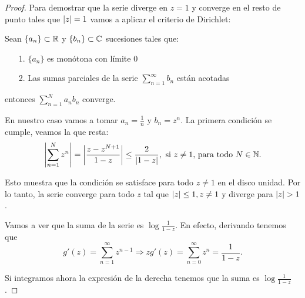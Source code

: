 \begin{proof}
    Para demostrar que la serie diverge en $z = 1$  y converge en el resto de punto tales que $\left\lvert z\right\rvert = 1$ vamos a aplicar el criterio de Dirichlet: \\ \par

    Sean $\{a_n\} \subset \mathbb{R}$ y $\{b_n\} \subset \mathbb{C}$ sucesiones tales que:
    \begin{itemize}
        \item[1.] $\{a_n\}$ es monótona con límite $0$
        \item[2.] Las sumas parciales de la serie $\sum_{n=1}^{\infty} b_n$ están acotadas
    \end{itemize}
    entonces $\sum_{n=1}^{N} a_nb_n$ converge. \\ \par

    En nuestro caso vamos a tomar $a_n = \frac{1}{n}$ y $b_n = z^n$. La primera condición se cumple, veamos la que resta:
    \begin{equation*}
        \left\lvert\sum_{n=1}^{N} z^n\right\rvert = \left\lvert\frac{z - z^{N+1}}{1 - z}\right\rvert \leq \frac{2}{\left\lvert1 - z\right\rvert}, \text{ si } z \neq 1 \text{, para todo } N \in \mathbb{N}.
    \end{equation*}

    Esto muestra que la condición se satisface para todo $z \not = 1$ en el disco unidad. Por lo tanto, la serie converge para todo $z$ tal que $\left\lvert z\right\rvert \leq 1, z \not = 1$ y diverge para $\left\lvert z\right\rvert > 1$. \\ \par

    Vamos a ver que la suma de la serie es $\log{\frac{1}{1 - z}}$. En efecto, derivando tenemos que
    \begin{equation*}
        g'(z) = \sum_{n=1}^{\infty} z^{n-1} \Rightarrow z g'(z) = \sum_{n=0}^{\infty} z^n = \frac{1}{1 - z}.
     \end{equation*}

     Si integramos ahora la expresión de la derecha tenemos que la suma es $\log{\frac{1}{1 - z}}$. %

\end{proof}

